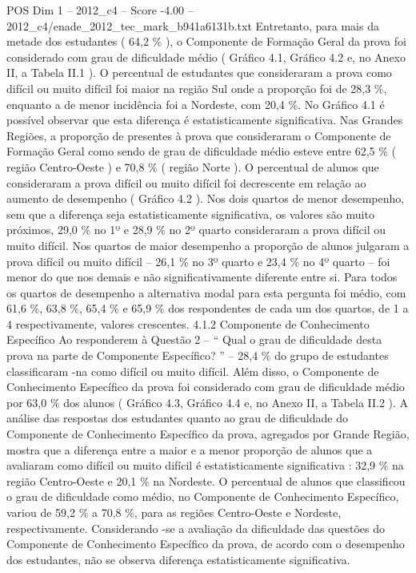 \begin{textsample}{POS Dim 1 – 2012\_c4 – Score -4.00 – 2012\_c4/enade\_2012\_tec\_mark\_b941a6131b.txt}
Entretanto, para mais da metade dos estudantes ( 64,2 \% ), o Componente de Formação Geral da prova foi considerado com grau de dificuldade médio ( Gráfico 4.1, Gráfico 4.2 e, no Anexo II, a Tabela II.1 ).
O percentual de estudantes que consideraram a prova como difícil ou muito difícil foi maior na região Sul onde a proporção foi de 28,3 \%, enquanto a de menor incidência foi a Nordeste, com 20,4 \%.
No Gráfico 4.1 é possível observar que esta diferença é estatisticamente significativa.
Nas Grandes Regiões, a proporção de presentes à prova que consideraram o Componente de Formação Geral como sendo de grau de dificuldade médio esteve entre 62,5 \% ( região Centro-Oeste ) e 70,8 \% ( região Norte ).
O percentual de alunos que consideraram a prova difícil ou muito difícil foi decrescente em relação ao aumento de desempenho ( Gráfico 4.2 ).
Nos dois quartos de menor desempenho, sem que a diferença seja estatisticamente significativa, os valores são muito próximos, 29,0 \% no 1º e 28,9 \% no 2º quarto consideraram a prova difícil ou muito difícil.
Nos quartos de maior desempenho a proporção de alunos julgaram a prova difícil ou muito difícil – 26,1 \% no 3º quarto e 23,4 \% no 4º quarto – foi menor do que nos demais e não significativamente diferente entre si.
Para todos os quartos de desempenho a alternativa modal para esta pergunta foi médio, com 61,6 \%, 63,8 \%, 65,4 \% e 65,9 \% dos respondentes de cada um dos quartos, de 1 a 4 respectivamente, valores crescentes. 4.1.2 Componente de Conhecimento Específico Ao responderem à Questão 2 – “ Qual o grau de dificuldade desta prova na parte de Componente Específico? ” – 28,4 \% do grupo de estudantes classificaram -na como difícil ou muito difícil.
Além disso, o Componente de Conhecimento Específico da prova foi considerado com grau de dificuldade médio por 63,0 \% dos alunos ( Gráfico 4.3, Gráfico 4.4 e, no Anexo II, a Tabela II.2 ).
A análise das respostas dos estudantes quanto ao grau de dificuldade do Componente de Conhecimento Específico da prova, agregados por Grande Região, mostra que a diferença entre a maior e a menor proporção de alunos que a avaliaram como difícil ou muito difícil é estatisticamente significativa : 32,9 \% na região Centro-Oeste e 20,1 \% na Nordeste.
O percentual de alunos que classificou o grau de dificuldade como médio, no Componente de Conhecimento Específico, variou de 59,2 \% a 70,8 \%, para as regiões Centro-Oeste e Nordeste, respectivamente.
Considerando -se a avaliação da dificuldade das questões do Componente de Conhecimento Específico da prova, de acordo com o desempenho dos estudantes, não se observa diferença estatisticamente significativa.

\end{textsample}
